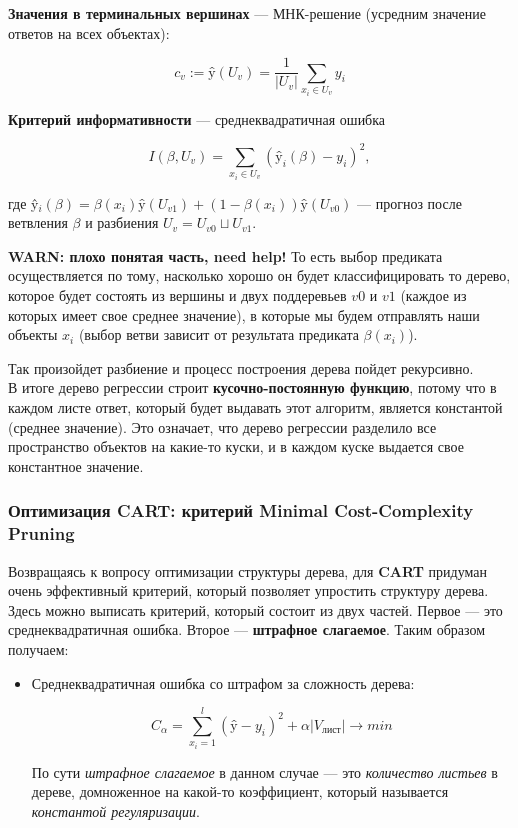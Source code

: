 \documentclass{article}
\begin{document}
\textbf{Значения в терминальных вершинах} --- МНК-решение (усредним значение ответов на всех объектах):

$$c_v := \text{\^y}(U_v) = \frac{1}{|U_v|}\sum\limits_{x_i \in U_v} y_i$$

\textbf{Критерий информативности} --- среднеквадратичная ошибка

$$I(\beta, U_v) = \sum\limits_{x_i \in U_v}(\text{\^y}_i(\beta) - y_i)^2,$$

где \^y$_i(\beta) = \beta(x_i)\text{\^y}(U_{v1}) + (1 - \beta(x_i))\text{\^y}(U_{v0})$ --- прогноз после ветвления $\beta$ и разбиения $U_v = U_{v0} \sqcup U_{v1}$.

\textbf{WARN: плохо понятая часть, need help! }
То есть выбор предиката осуществляется по тому, насколько хорошо он будет классифицировать то дерево, которое будет состоять из вершины и двух поддеревьев $v0$ и $v1$ (каждое из которых имеет свое среднее значение), в которые мы будем отправлять наши объекты $x_i$ (выбор ветви зависит от результата предиката $\beta(x_i)$).

Так произойдет разбиение и процесс построения дерева пойдет рекурсивно.
\\

В итоге дерево регрессии строит \textbf{кусочно-постоянную функцию}, потому что в каждом листе ответ, который будет выдавать этот алгоритм, является константой (среднее значение). Это означает, что дерево регрессии разделило все пространство объектов на какие-то куски, и в каждом куске выдается свое константное значение.

\subsubsection{Оптимизация CART: критерий Minimal Cost-Complexity Pruning}

Возвращаясь к вопросу оптимизации структуры дерева, для \textbf{CART} придуман очень эффективный критерий, который позволяет упростить структуру дерева.
\\

Здесь можно выписать критерий, который состоит из двух частей. Первое --- это среднеквадратичная ошибка. Второе --- \textbf{штрафное слагаемое}. Таким образом получаем:

\begin{itemize}
\item Среднеквадратичная ошибка со штрафом за сложность дерева:

$$C_\alpha =
\sum\limits_{x_i = 1}^l(\text{\^y} - y_i)^2 + \alpha|V_\text{лист}| \rightarrow min$$

По сути \textit{штрафное слагаемое} в данном случае --- это \textit{количество листьев} в дереве, домноженное на какой-то коэффициент, который называется \textit{константой регуляризации}.
\end{itemize}
\end{document}
